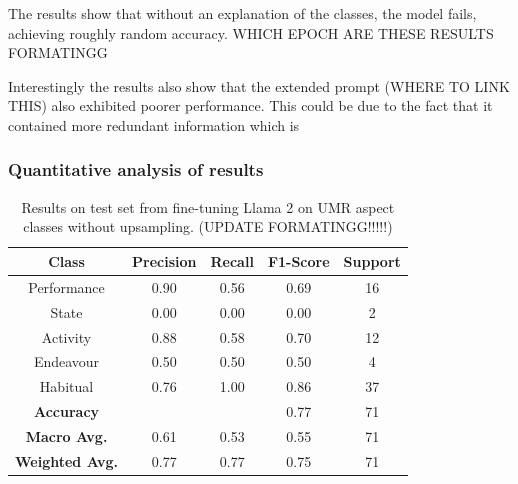 The results show that without an explanation of the classes, the model fails, achieving roughly random accuracy. WHICH EPOCH ARE THESE RESULTS FORMATINGG

Interestingly the results also show that the extended prompt (WHERE TO LINK THIS) also exhibited poorer performance. This could be due to the fact that it contained more redundant information which is 

\subsubsection*{Quantitative analysis of results}

\begin{table}
    \centering
    \begin{tabular}{|c|c|c|c|c|}\hline
        \textbf{Class} & \textbf{Precision} & \textbf{Recall} & \textbf{F1-Score} & \textbf{Support} \\ \hline
        Performance & 0.90 & 0.56 & 0.69 & 16\\ \hline
        State & 0.00 & 0.00 & 0.00 & 2\\\hline
        Activity & 0.88 & 0.58 & 0.70 & 12\\\hline
        Endeavour & 0.50 & 0.50 & 0.50 & 4\\\hline
        Habitual & 0.76 & 1.00 & 0.86 & 37\\ \hline \hline
        \textbf{Accuracy} &  &  & 0.77 & 71 \\ \hline
        \textbf{Macro Avg.} & 0.61  & 0.53 & 0.55 & 71 \\ \hline
        \textbf{Weighted Avg.} & 0.77  & 0.77 & 0.75 & 71 \\ \hline

    \end{tabular}
    \caption{Results on test set from fine-tuning Llama 2 on UMR aspect classes without upsampling. (UPDATE FORMATINGG!!!!!)}
\end{table}
\label{llama_results_no_upsampling}

